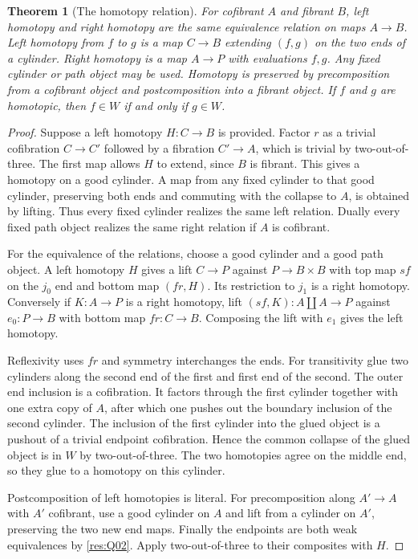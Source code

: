 \documentclass[11pt,oneside,openany]{book}
\newtheorem{theorem}{Theorem}[chapter]
\theoremstyle{definition}
\theoremstyle{remark}
\begin{document}
\begin{theorem}[The homotopy relation]\label{res:Q03}
For cofibrant \(A\) and fibrant \(B\), left homotopy and right
homotopy are the same equivalence relation on maps \(A\to B\).
Left homotopy from \(f\) to \(g\) is a map \(C\to B\) extending
\((f,g)\) on the two ends of a cylinder. Right homotopy is a
map \(A\to P\) with evaluations \(f,g\). Any fixed cylinder
or path object may be used. Homotopy is preserved by
precomposition from a cofibrant object and postcomposition
into a fibrant object. If \(f\) and \(g\) are homotopic,
then \(f\in W\) if and only if \(g\in W\).
\end{theorem}
\begin{proof}
Suppose a left homotopy \(H:C\to B\) is provided. Factor \(r\)
as a trivial cofibration \(C\to C'\) followed by a fibration
\(C'\to A\), which is trivial by two-out-of-three. The first map
allows \(H\) to extend, since \(B\) is fibrant. This gives a
homotopy on a good cylinder. A map from any fixed cylinder to
that good cylinder, preserving both ends and commuting with the
collapse to \(A\), is obtained by lifting. Thus every fixed
cylinder realizes the same left relation. Dually every fixed
path object realizes the same right relation if \(A\) is
cofibrant.

For the equivalence of the relations, choose a good cylinder
and a good path object. A left homotopy \(H\) gives a lift
\(C\to P\) against \(P\to B\times B\) with top map \(s f\)
on the \(j_0\) end and bottom map \((fr,H)\).
Its restriction to \(j_1\) is a right homotopy. Conversely
if \(K:A\to P\) is a right homotopy, lift
\((s f,K):A\amalg A\to P\) against \(e_0:P\to B\)
with bottom map \(fr:C\to B\). Composing the lift with
\(e_1\) gives the left homotopy.

Reflexivity uses \(fr\) and symmetry interchanges the ends.
For transitivity glue two cylinders along the second end
of the first and first end of the second. The outer end
inclusion is a cofibration. It factors through the first
cylinder together with one extra copy of \(A\), after which
one pushes out the boundary inclusion of the second cylinder.
The inclusion of the first cylinder into the glued object
is a pushout of a trivial endpoint cofibration. Hence the
common collapse of the glued object is in \(W\) by
two-out-of-three. The two homotopies agree on the middle end,
so they glue to a homotopy on this cylinder.

Postcomposition of left homotopies is literal. For
precomposition along \(A'\to A\) with \(A'\) cofibrant,
use a good cylinder on \(A\) and lift from a cylinder on
\(A'\), preserving the two new end maps. Finally the
endpoints are both weak equivalences by \ref{res:Q02}.
Apply two-out-of-three to their composites with \(H\).
\end{proof}
\end{document}
